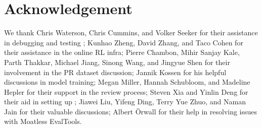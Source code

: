 \section*{Acknowledgement}

We thank Chris Waterson, Chris Cummins, and Volker Seeker for their assistance in debugging and testing \ouragentless;
Kunhao Zheng, David Zhang, and Taco Cohen for their assistance in the online RL infra;
Pierre Chambon, Mihir Sanjay Kale, Parth Thakkar, Michael Jiang, Sinong Wang, and Jingyue Shen for their involvement in the PR dataset discussion;
Jannik Kossen for his helpful discussions in model training;
Megan Miller, Hannah Schubloom, and Madeline Hepler for their support in the review process;
Steven Xia and Yinlin Deng for their aid in setting up \agentless;
Jiawei Liu, Yifeng Ding, Terry Yue Zhuo, and Naman Jain for their valuable discussions;
Albert Örwall for their help in resolving issues with Moatless EvalTools.
